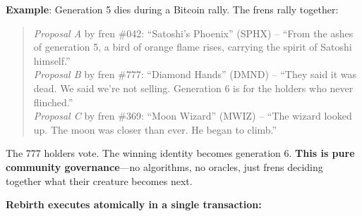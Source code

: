 \documentclass[11pt,a4paper]{article}
\begin{document}
\textbf{Example}: Generation 5 dies during a Bitcoin rally. The frens rally together:

\begin{quote}
\textit{Proposal A} by fren \#042: ``Satoshi's Phoenix'' (SPHX) -- ``From the ashes of generation 5, a bird of orange flame rises, carrying the spirit of Satoshi himself.'' \\
\textit{Proposal B} by fren \#777: ``Diamond Hands'' (DMND) -- ``They said it was dead. We said we're not selling. Generation 6 is for the holders who never flinched.'' \\
\textit{Proposal C} by fren \#369: ``Moon Wizard'' (MWIZ) -- ``The wizard looked up. The moon was closer than ever. He began to climb.''
\end{quote}

The 777 holders vote. The winning identity becomes generation 6. \textbf{This is pure community governance}---no algorithms, no oracles, just frens deciding together what their creature becomes next.

\textbf{Rebirth executes atomically in a single transaction:}
\end{document}
